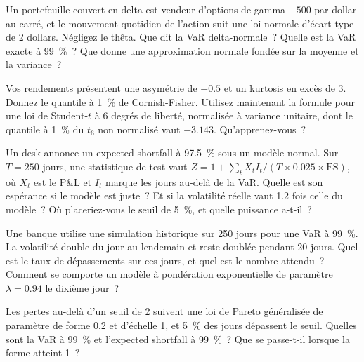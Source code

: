 \begin{question}\label{iq:iv2:risk-validation-and-regulation:26}
Un portefeuille couvert en delta est vendeur d'options de gamma $-500$ par dollar au carré, et le mouvement quotidien de l'action suit une loi normale d'écart type de 2 dollars. Négligez le thêta. Que dit la VaR delta-normale~? Quelle est la VaR exacte à 99~\%~? Que donne une approximation normale fondée sur la moyenne et la variance~?
\end{question}

\begin{question}\label{iq:iv2:risk-validation-and-regulation:27}
Vos rendements présentent une asymétrie de $-0.5$ et un kurtosis en excès de 3. Donnez le quantile à 1~\% de Cornish-Fisher. Utilisez maintenant la formule pour une loi de Student-$t$ à 6 degrés de liberté, normalisée à variance unitaire, dont le quantile à 1~\% du $t_6$ non normalisé vaut $-3.143$. Qu'apprenez-vous~?
\end{question}

\begin{question}\label{iq:iv2:risk-validation-and-regulation:28}
Un desk annonce un expected shortfall à 97.5~\% sous un modèle normal. Sur $T = 250$ jours, une statistique de test vaut $Z = 1 + \sum_t X_t I_t/(T \times 0.025 \times \mathrm{ES})$, où $X_t$ est le P\&L et $I_t$ marque les jours au-delà de la VaR. Quelle est son espérance si le modèle est juste~? Et si la volatilité réelle vaut 1.2 fois celle du modèle~? Où placeriez-vous le seuil de 5~\%, et quelle puissance a-t-il~?
\end{question}

\begin{question}\label{iq:iv2:risk-validation-and-regulation:29}
Une banque utilise une simulation historique sur 250 jours pour une VaR à 99~\%. La volatilité double du jour au lendemain et reste doublée pendant 20 jours. Quel est le taux de dépassements sur ces jours, et quel est le nombre attendu~? Comment se comporte un modèle à pondération exponentielle de paramètre $\lambda = 0.94$ le dixième jour~?
\end{question}

\begin{question}\label{iq:iv2:risk-validation-and-regulation:30}
Les pertes au-delà d'un seuil de 2 suivent une loi de Pareto généralisée de paramètre de forme 0.2 et d'échelle 1, et 5~\% des jours dépassent le seuil. Quelles sont la VaR à 99~\% et l'expected shortfall à 99~\%~? Que se passe-t-il lorsque la forme atteint 1~?
\end{question}

